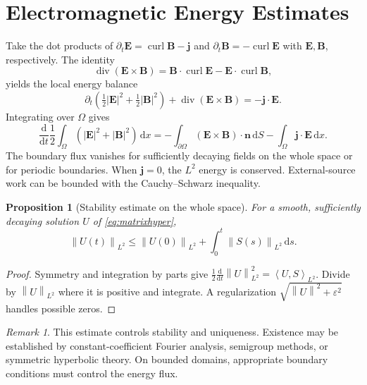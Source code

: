 \documentclass[11pt,openany]{book}
\numberwithin{equation}{chapter}
\newtheorem{proposition}[theorem]{Proposition}
\theoremstyle{definition}
\theoremstyle{remark}
\newtheorem{remark}[theorem]{Remark}
\newcommand{\dd}{\mathrm d}
\newcommand{\Div}{\operatorname{div}}
\newcommand{\curl}{\operatorname{curl}}
\newcommand{\norm}[1]{\left\lVert #1\right\rVert}
\newcommand{\ip}[2]{\left\langle #1,#2\right\rangle}
\begin{document}
\section{Electromagnetic Energy Estimates}
Take the dot products of $\partial_t\bm E=\curl\bm B-\bm j$ and $\partial_t\bm B=-\curl\bm E$ with $\bm E,\bm B$, respectively. The identity
\begin{equation}
\Div(\bm E\times\bm B)=\bm B\cdot\curl\bm E-\bm E\cdot\curl\bm B,
\end{equation}
yields the local energy balance
\begin{equation}\label{eq:poynting}
\boxed{\partial_t\left(\tfrac12|\bm E|^2+\tfrac12|\bm B|^2\right)
+\Div(\bm E\times\bm B)=-\bm j\cdot\bm E.}
\end{equation}
Integrating over $\Omega$ gives
\begin{equation}\label{eq:energyintegral}
\frac{\dd}{\dd t}\frac12\int_\Omega(|\bm E|^2+|\bm B|^2)\,\dd x
=-\int_{\partial\Omega}(\bm E\times\bm B)\cdot\bm n\,\dd S
-\int_\Omega\bm j\cdot\bm E\,\dd x.
\end{equation}
The boundary flux vanishes for sufficiently decaying fields on the whole space or for periodic boundaries. When $\bm j=0$, the $L^2$ energy is conserved. External-source work can be bounded with the Cauchy--Schwarz inequality.

\begin{proposition}[Stability estimate on the whole space]
For a smooth, sufficiently decaying solution $U$ of \eqref{eq:matrixhyper},
\begin{equation}\label{eq:energyestimate}
\norm{U(t)}_{L^2}\leq\norm{U(0)}_{L^2}+\int_0^t\norm{S(s)}_{L^2}\,\dd s.
\end{equation}
\end{proposition}
\begin{proof}
Symmetry and integration by parts give $\tfrac12\frac{\dd}{\dd t}\norm U_{L^2}^2=\ip{U}{S}_{L^2}$. Divide by $\norm U_{L^2}$ where it is positive and integrate. A regularization $\sqrt{\norm U^2+\varepsilon^2}$ handles possible zeros.
\end{proof}
\begin{remark}
This estimate controls stability and uniqueness. Existence may be established by constant-coefficient Fourier analysis, semigroup methods, or symmetric hyperbolic theory. On bounded domains, appropriate boundary conditions must control the energy flux.
\end{remark}
\end{document}
